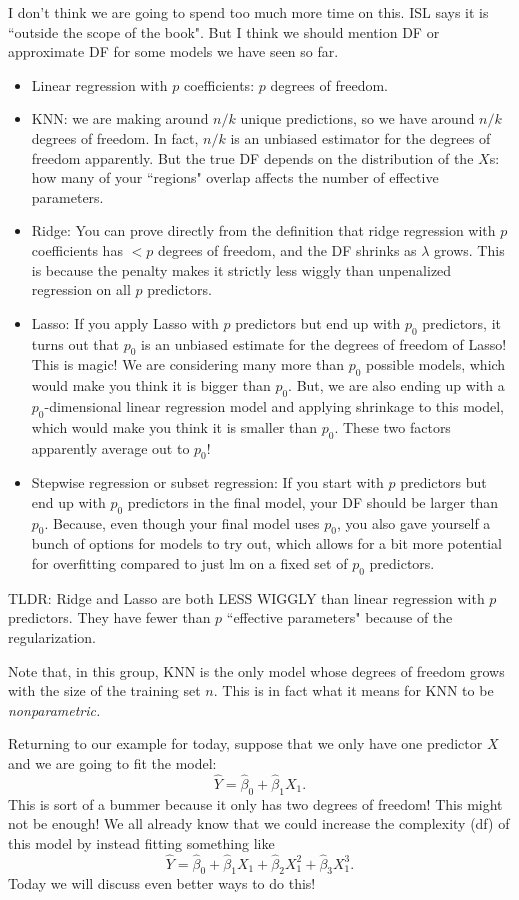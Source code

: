 I don't think we are going to spend too much more time on this. ISL says it is ``outside the scope of the book". But I think we should mention DF or approximate DF for some models we have seen so far. 
\begin{itemize}
\item Linear regression with $p$ coefficients: $p$ degrees of freedom. 
\item KNN: we are making around $n/k$ unique predictions, so we have around $n/k$ degrees of freedom. In fact, $n/k$ is an unbiased estimator for the degrees of freedom apparently. But the true DF depends on the distribution of the $X$s: how many of your ``regions" overlap affects the number of effective parameters. 
\item Ridge: You can prove directly from the definition that ridge regression with $p$ coefficients has $< p$ degrees of freedom, and the DF shrinks as $\lambda$ grows. This is because the penalty makes it strictly less wiggly than unpenalized regression on all $p$ predictors. 
\item Lasso: If you apply Lasso with $p$ predictors but end up with $p_0$ predictors, it turns out that $p_0$ is an unbiased estimate for the degrees of freedom of Lasso! This is magic! We are considering many more than $p_0$ possible models, which would make you think it is bigger than $p_0$. But, we are also ending up with a $p_0$-dimensional linear regression model and applying shrinkage to this model, which would make you think it is smaller than $p_0$. These two factors apparently average out to $p_0$! 
\item Stepwise regression or subset regression: If you start with $p$ predictors but end up with $p_0$ predictors in the final model, your DF should be larger than $p_0$. Because, even though your final model uses $p_0$, you also gave yourself a bunch of options for models to try out, which allows for a bit more potential for overfitting compared to just lm on a fixed set of $p_0$ predictors. 
\end{itemize}

TLDR: Ridge and Lasso are both LESS WIGGLY than linear regression with $p$ predictors. They have fewer than $p$ ``effective parameters" because of the regularization. 

Note that, in this group, KNN is the only model whose degrees of freedom grows with the size of the training set $n$. This is in fact what it means for KNN to be \emph{nonparametric.}

Returning to our example for today, suppose that we only have one predictor $X$ and we are going to fit the model:
$$
\hat{Y} = \hat{\beta}_0 + \hat{\beta}_1 X_1.
$$
This is sort of a bummer because it only has two degrees of freedom! This might not be enough! We all already know that we could increase the complexity (df) of this model by instead fitting something like 
$$
\hat{Y} = \hat{\beta}_0 + \hat{\beta}_1 X_1 + \hat{\beta}_2 X_1^2 + \hat{\beta}_3 X_1^3.
$$
Today we will discuss even better ways to do this!



